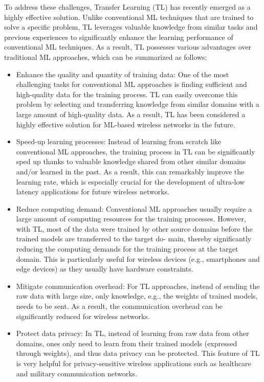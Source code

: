 \documentclass[letterpaper%
, oneside%
, 12pt%
,thesepararticles%
, english%
,creativecommons,hyperref, withAlgo2e%
]{thETS}
\begin{document}
\begin{introduction}
To address these challenges, Transfer Learning (TL) has recently emerged as a highly effective solution. Unlike conventional ML techniques that are trained to solve a specific problem, TL leverages valuable knowledge from similar tasks and previous experiences to significantly enhance the learning performance of conventional ML techniques. As a result, TL possesses various advantages over traditional ML approaches, which can be summarized as follows;
\begin{itemize}
	\item Enhance the quality and quantity of training data: One of the most challenging tasks for conventional ML approaches is finding sufficient and high-quality data for the training process. TL can easily overcome this problem by selecting and transferring knowledge from similar domains with a large amount of high-quality data. As a result, TL has been considered a highly effective solution for ML-based wireless networks in the future.
	\item Speed-up learning processes: Instead of learning from scratch like conventional ML approaches, the training process in TL can be significantly sped up thanks to valuable knowledge shared from other similar domains and/or learned in the past. As a result, this can remarkably improve the learning rate, which is especially crucial for the development of ultra-low latency applications for future wireless networks.
	\item Reduce computing demand: Conventional ML approaches usually require a large amount of computing resources for the training processes. However, with TL, most of the data were trained by other source domains before the trained models are transferred to the target do- main, thereby significantly reducing the computing demands for the training process at the target domain. This is particularly useful for wireless devices (e.g., smartphones and edge devices) as they usually have hardware constraints.
	\item Mitigate communication overhead: For TL approaches, instead of sending the raw data with large size, only knowledge, e.g., the weights of trained models, needs to be sent. As a result, the communication overhead can be significantly reduced for wireless networks.
	\item{Protect data privacy: In TL, instead of learning from raw data from other domains, ones only need to learn from their trained models (expressed through weights), and thus data privacy can be protected. This feature of TL is very helpful for privacy-sensitive wireless applications such as healthcare and military communication networks.}
\end{itemize}

\end{introduction}
\end{document}
